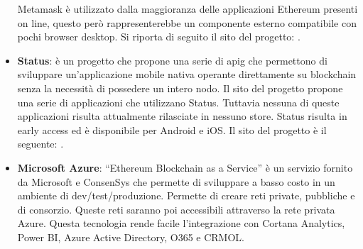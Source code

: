 \begin{itemize}
    Metamask è utilizzato dalla maggioranza delle applicazioni Ethereum presenti on line, questo però rappresenterebbe un componente esterno compatibile con pochi browser desktop. Si riporta di seguito il sito del progetto: \cite{site:metamask} .
    \item \textbf{Status}: è un progetto che propone una serie di \gls{apig} che permettono di sviluppare un’applicazione mobile nativa operante direttamente su blockchain senza la necessità di possedere un intero nodo. Il sito del progetto propone una serie di applicazioni che utilizzano Status. Tuttavia nessuna di queste applicazioni risulta attualmente rilasciate in nessuno store. Status risulta in early access ed è disponibile per Android e iOS. Il sito del progetto è il seguente: \cite{site:status}.
    \item \textbf{Microsoft Azure}: “Ethereum Blockchain as a Service” è un servizio fornito da Microsoft e ConsenSys che permette di sviluppare a basso costo in un ambiente di dev/test/produzione. Permette di creare reti private, pubbliche e di consorzio. Queste reti saranno poi accessibili attraverso la rete privata Azure. Questa tecnologia rende facile l’integrazione con Cortana Analytics, Power BI, Azure Active Directory, O365 e CRMOL.
\end{itemize}






